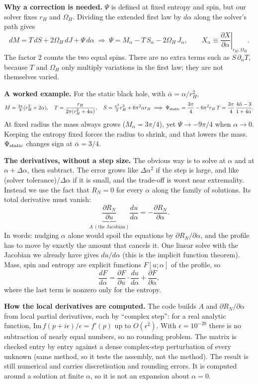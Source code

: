 \documentclass[12pt,a4paper]{article}
\begin{document}
\textbf{Why a correction is needed.} $\Psi$ is defined at fixed entropy and spin, but
our solver fixes $r_H$ and $\Omega_H$. Dividing the extended first law by $d\alpha$
along the solver's path gives
\[
dM=T\,dS+2\Omega_H\,dJ+\Psi\,d\alpha\;\Longrightarrow\;
\Psi=M_\alpha-T\,S_\alpha-2\Omega_H\,J_\alpha,\qquad
X_\alpha\equiv\left.\frac{\partial X}{\partial\alpha}\right|_{r_H,\Omega_H}.
\]
The factor 2 counts the two equal spins. There are no extra terms such as
$S\,\partial_\alpha T$, because $T$ and $\Omega_H$ only multiply variations in the
first law; they are not themselves varied.

\textbf{A worked example.} For the static black hole, with $\bar\alpha=\alpha/r_H^2$,
\[
M=\tfrac{3\pi}{8}(r_H^2+2\alpha),\quad T=\frac{r_H}{2\pi(r_H^2+4\alpha)},\quad
S=\tfrac{\pi^2}{2}r_H^3+6\pi^2\alpha r_H
\;\Longrightarrow\;
\Psi_{\rm static}=\frac{3\pi}{4}-6\pi^2r_H\,T=\frac{3\pi}{4}\,\frac{4\bar\alpha-3}{1+4\bar\alpha}.
\]
At fixed radius the mass always grows ($M_\alpha=3\pi/4$), yet $\Psi\to-9\pi/4$ when
$\alpha\to0$. Keeping the entropy fixed forces the radius to shrink, and that lowers
the mass. $\Psi_{\rm static}$ changes sign at $\bar\alpha=3/4$.

\textbf{The derivatives, without a step size.} The obvious way is to solve at
$\alpha$ and at $\alpha+\Delta\alpha$, then subtract. The error grows like
$\Delta\alpha^2$ if the step is large, and like (solver tolerance)$/\Delta\alpha$ if
it is small, and the trade-off is worst near extremality. Instead we use the fact
that $R_N=0$ for every $\alpha$ along the family of solutions. Its total derivative
must vanish:
\[
\underbrace{\frac{\partial R_N}{\partial u}}_{A\ (\text{the Jacobian})}\frac{du}{d\alpha}
=-\frac{\partial R_N}{\partial\alpha}.
\]
In words: nudging $\alpha$ alone would spoil the equations by $\partial R_N/\partial\alpha$,
and the profile has to move by exactly the amount that cancels it. One linear solve
with the Jacobian we already have gives $du/d\alpha$ (this is the implicit function
theorem). Mass, spin and entropy are explicit functions $F[u;\alpha]$ of the profile,
so
\[
\frac{dF}{d\alpha}=\frac{\partial F}{\partial u}\cdot\frac{du}{d\alpha}+\frac{\partial F}{\partial\alpha},
\]
where the last term is nonzero only for the entropy.

\textbf{How the local derivatives are computed.} The code builds $A$ and
$\partial R_N/\partial\alpha$ from local partial derivatives, each by ``complex
step'': for a real analytic function, $\mathrm{Im}\,f(p+i\epsilon)/\epsilon=f'(p)$
up to $O(\epsilon^2)$. With $\epsilon=10^{-20}$ there is no subtraction of nearly
equal numbers, so no rounding problem. The matrix is checked entry by entry against
a dense complex-step perturbation of every unknown (same method, so it tests the
assembly, not the method). The result is still numerical and carries discretisation
and rounding errors. It is computed around a solution at finite $\alpha$, so it is
not an expansion about $\alpha=0$.
\end{document}

